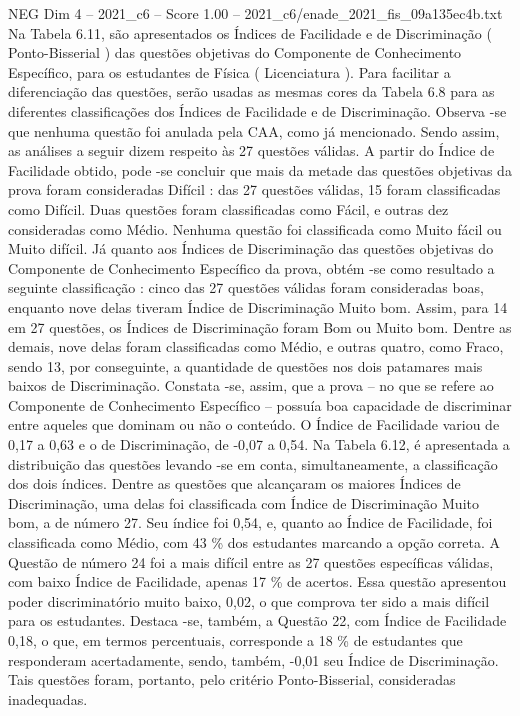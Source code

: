 \begin{textsample}{NEG Dim 4 – 2021\_c6 – Score 1.00 – 2021\_c6/enade\_2021\_fis\_09a135ec4b.txt}
Na Tabela 6.11, são apresentados os Índices de Facilidade e de Discriminação ( Ponto-Bisserial ) das questões objetivas do Componente de Conhecimento Específico, para os estudantes de Física ( Licenciatura ).
Para facilitar a diferenciação das questões, serão usadas as mesmas cores da Tabela 6.8 para as diferentes classificações dos Índices de Facilidade e de Discriminação.
Observa -se que nenhuma questão foi anulada pela CAA, como já mencionado.
Sendo assim, as análises a seguir dizem respeito às 27 questões válidas.
A partir do Índice de Facilidade obtido, pode -se concluir que mais da metade das questões objetivas da prova foram consideradas Difícil : das 27 questões válidas, 15 foram classificadas como Difícil.
Duas questões foram classificadas como Fácil, e outras dez consideradas como Médio.
Nenhuma questão foi classificada como Muito fácil ou Muito difícil.
Já quanto aos Índices de Discriminação das questões objetivas do Componente de Conhecimento Específico da prova, obtém -se como resultado a seguinte classificação : cinco das 27 questões válidas foram consideradas boas, enquanto nove delas tiveram Índice de Discriminação Muito bom.
Assim, para 14 em 27 questões, os Índices de Discriminação foram Bom ou Muito bom.
Dentre as demais, nove delas foram classificadas como Médio, e outras quatro, como Fraco, sendo 13, por conseguinte, a quantidade de questões nos dois patamares mais baixos de Discriminação.
Constata -se, assim, que a prova – no que se refere ao Componente de Conhecimento Específico – possuía boa capacidade de discriminar entre aqueles que dominam ou não o conteúdo.
O Índice de Facilidade variou de 0,17 a 0,63 e o de Discriminação, de -0,07 a 0,54.
Na Tabela 6.12, é apresentada a distribuição das questões levando -se em conta, simultaneamente, a classificação dos dois índices.
Dentre as questões que alcançaram os maiores Índices de Discriminação, uma delas foi classificada com Índice de Discriminação Muito bom, a de número 27.
Seu índice foi 0,54, e, quanto ao Índice de Facilidade, foi classificada como Médio, com 43 \% dos estudantes marcando a opção correta.
A Questão de número 24 foi a mais difícil entre as 27 questões específicas válidas, com baixo Índice de Facilidade, apenas 17 \% de acertos.
Essa questão apresentou poder discriminatório muito baixo, 0,02, o que comprova ter sido a mais difícil para os estudantes.
Destaca -se, também, a Questão 22, com Índice de Facilidade 0,18, o que, em termos percentuais, corresponde a 18 \% de estudantes que responderam acertadamente, sendo, também, -0,01 seu Índice de Discriminação.
Tais questões foram, portanto, pelo critério Ponto-Bisserial, consideradas inadequadas.

\end{textsample}
